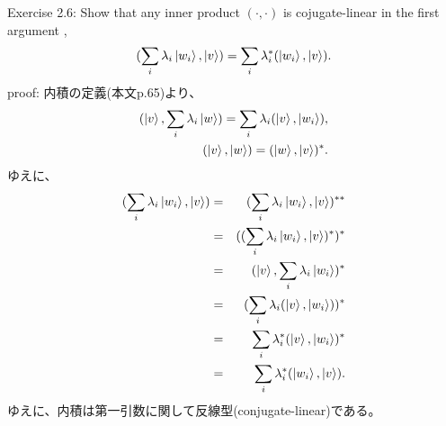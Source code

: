 \begin{flushleft}
\setcounter{equation}{0}
{\Large Exercise 2.6:} Show that any inner product $(\cdot, \cdot)$ is cojugate-linear in the first argument ,
\begin{equation}
(\sum_{i} \lambda_i \ket{w_i}, \ket{v}) = \sum_i \lambda_{i}^* (\ket{w_i}, \ket{v}).
\end{equation}
{\large proof:} 内積の定義(本文p.65)より、
\begin{eqnarray}
(\ket{v}, \sum_{i} \lambda_i \ket{w}) = \sum_{i} \lambda_i (\ket{v}, \ket{w_i}), \\ 
(\ket{v}, \ket{w}) = (\ket{w}, \ket{v})^*.
\end{eqnarray}
ゆえに、
\begin{eqnarray*}
(\sum_i \lambda_i \ket{w_i}, \ket{v}) &=&  (\sum_i \lambda_i \ket{w_i}, \ket{v})^{**} \\ 
&=&
((\sum_i \lambda_i \ket{w_i}, \ket{v})^*)^* \\
&=&(\ket{v}, \sum_i \lambda_i \ket{w_i})^*\\
&=&(\sum_i \lambda_i (\ket{v}, \ket{w_i}))^*\\
&=&\sum_i \lambda_{i}^* (\ket{v}, \ket{w_i})^*\\
&=&\sum_i \lambda_{i}^* (\ket{w_i}, \ket{v}).\\
\end{eqnarray*}
ゆえに、内積は第一引数に関して反線型(conjugate-linear)である。
\end{flushleft}

